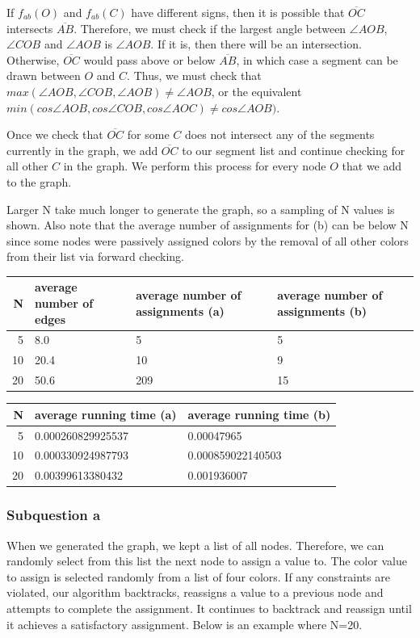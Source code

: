 If $f_{ab}(O)$ and $f_{ab}(C)$ have different signs, then it is possible that $\overline{OC}$ intersects $\overline{AB}$. Therefore, we must check if the largest angle between $\angle AOB$, $\angle COB$ and $\angle AOB$ is $\angle AOB$. If it is, then there will be an intersection. Otherwise, $\overline{OC}$ would pass above or below $\overline{AB}$, in which case a segment can be drawn between $O$ and $C$. Thus, we must check that $max(\angle AOB, \angle COB, \angle AOB)\ne \angle AOB$, or the equivalent $min(cos\angle AOB, cos\angle COB, cos\angle AOC) \ne cos\angle AOB)$.

Once we check that $\overline{OC}$ for some $C$ does not intersect any of the segments currently in the graph, we add $\overline{OC}$ to our segment list and continue checking for all other $C$ in the graph. We perform this process for every node $O$ that we add to the graph.

Larger N take much longer to generate the graph, so a sampling of N values is shown. Also note that the average number of assignments for (b) can be below N since some nodes were passively assigned colors by the removal of all other colors from their list via forward checking.

\begin{tabular}{r|l|l|l}
  N & average number of edges & average number of assignments (a) & average number of assignments (b) \\
  \hline
  5 & 8.0 & 5 & 5 \\
  10 & 20.4 & 10 & 9 \\
  20 & 50.6 & 209 & 15 \\
\end{tabular}

\begin{tabular}{r|l|l}
  N & average running time (a) & average running time (b) \\
  \hline
  5 & 0.000260829925537 & 0.00047965 \\
  10 & 0.000330924987793 & 0.000859022140503 \\
  20 & 0.00399613380432 & 0.001936007 \\
\end{tabular}

\subsubsection*{Subquestion a}
When we generated the graph, we kept a list of all nodes. Therefore, we can randomly select from this list the next node to assign a value to. The color value to assign is selected randomly from a list of four colors. If any constraints are violated, our algorithm backtracks, reassigns a value to a previous node and attempts to complete the assignment. It continues to backtrack and reassign until it achieves a satisfactory assignment. Below is an example where N=20.

